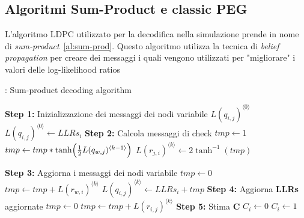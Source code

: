


\subsection{Algoritmi Sum-Product e classic PEG}\label{subse:algorithms}
L'algoritmo LDPC utilizzato per la decodifica nella simulazione prende in nome di \textit{sum-product}~\ref{al:sum-prod}. Questo algoritmo utilizza la tecnica di \textit{belief propagation} per creare dei messaggi i quali vengono utilizzati per "migliorare" i valori delle log-likelihood ratios 

\begin{algorithm} 
\caption{: Sum-product decoding algorithm}\label{al:sum-prod}
\begin{algorithmic}
\State \textbf{Step 1: }Inizializzazione dei messaggi dei nodi variabile $L(q_{i,j})^{\langle 0 \rangle}$
		\State $L(q_{i,j})^{\langle 0 \rangle} \leftarrow LLRs_i$
	\EndFor
\EndFor
{}
	\State \textbf{Step 2: } Calcola messaggi di check
		\State $tmp \leftarrow 1$
					\State $tmp \leftarrow tmp * \tanh \Bigl ( \frac{1}{2}L(q_{w,j})^{\langle k-1 \rangle} \Bigr ) $
				\EndIf
			\EndFor
		\State $L(r_{j,i})^{\langle k \rangle} \leftarrow 2 \tanh^{-1} (tmp)$
		\EndFor
	\EndFor
	
	\State \textbf{Step 3: }Aggiorna i messaggi dei nodi variabile 
		\State $tmp \leftarrow 0$
					\State $tmp \leftarrow tmp + L(r_{w,i})^{\langle k \rangle} $
				\EndIf
			\EndFor
		\State $L(q_{i,j})^{\langle k \rangle} \leftarrow LLRs_i + tmp$
		\EndFor
	\EndFor
\State  \textbf{Step 4: }Aggiorna \textbf{LLRs} aggiornate
	\State $tmp \leftarrow 0$
		\State $tmp \leftarrow tmp + L(r_{i,j})^{\langle k \rangle}$
	\EndFor
\EndFor
\EndFor
\State \textbf{Step 5: }Stima \textbf{C}
		\State$C_i \leftarrow 0$
	\Else
		\State$C_i \leftarrow 1$
	\EndIf
\EndFor

\end{algorithmic}
\end{algorithm}







